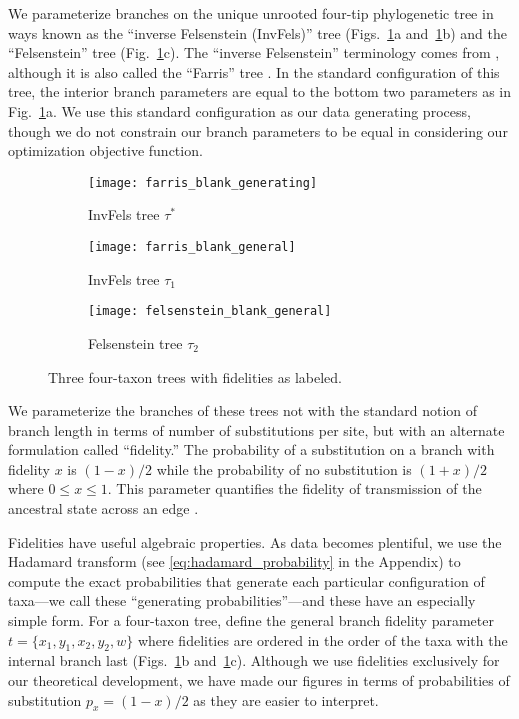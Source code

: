\documentclass[11pt]{article}
\begin{document}
We parameterize branches on the unique unrooted four-tip phylogenetic tree in ways known as the ``inverse Felsenstein (InvFels)'' tree (Figs.~\ref{fig:farris-fels-top}a and~\ref{fig:farris-fels-top}b) and the ``Felsenstein'' tree (Fig.~\ref{fig:farris-fels-top}c).
The ``inverse Felsenstein'' terminology comes from \citet{Swofford2001-hr}, although it is also called the ``Farris'' tree \citep{Siddall1998-hq, Felsenstein2004}.
In the standard configuration of this tree, the interior branch parameters are equal to the bottom two parameters as in Fig.~\ref{fig:farris-fels-top}a.
We use this standard configuration as our data generating process, though we do not constrain our branch parameters to be equal in considering our optimization objective function.

\begin{figure}
\centering
\begin{subfigure}{.32\linewidth}
\centering
\texttt{[image: farris\_blank\_generating]}
\caption[short]{InvFels tree $\tau^*$}
\end{subfigure}
\begin{subfigure}{.32\linewidth}
\centering
\texttt{[image: farris\_blank\_general]}
\caption[short]{InvFels tree $\tau_1$}
\end{subfigure}
\begin{subfigure}{.32\linewidth}
\centering
\texttt{[image: felsenstein\_blank\_general]}
\caption[short]{Felsenstein tree $\tau_2$}
\end{subfigure}
\caption{Three four-taxon trees with fidelities as labeled.}
\label{fig:farris-fels-top}
\end{figure}

We parameterize the branches of these trees not with the standard notion of branch length in terms of number of substitutions per site, but with an alternate formulation called ``fidelity.''
The probability of a substitution on a branch with fidelity $x$ is $(1-x)/2$ while the probability of no substitution is $(1+x)/2$ where $0 \le x \le 1$.
This parameter quantifies the fidelity of transmission of the ancestral state across an edge \citep{Matsen2007-jq}.

Fidelities have useful algebraic properties.
As data becomes plentiful, we use the Hadamard transform (see \eqref{eq:hadamard_probability} in the Appendix) to compute the exact probabilities that generate each particular configuration of taxa---we call these ``generating probabilities''---and these have an especially simple form.
For a four-taxon tree, define the general branch fidelity parameter $t=\{x_1,y_1,x_2,y_2,w\}$ where fidelities are ordered in the order of the taxa with the internal branch last (Figs.~\ref{fig:farris-fels-top}b and~\ref{fig:farris-fels-top}c).
Although we use fidelities exclusively for our theoretical development, we have made our figures in terms of probabilities of substitution $p_{x} = (1-x)/2$ as they are easier to interpret.
\end{document}
